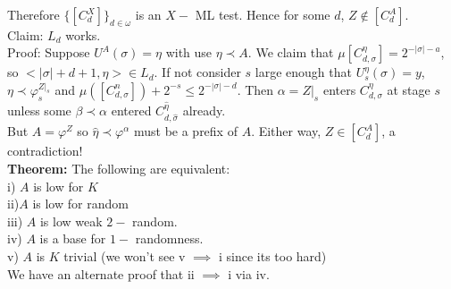 \documentclass{article}
\begin{document}
  Therefore $\{[C^X_d]\}_{d\in \omega}$ is an $X-$ ML test. Hence for some $d$, $Z \not \in [C_d^A]$. \\
  Claim: $L_d$ works.\\
  Proof: Suppose $U^A(\sigma) = \eta$ with use $\eta \prec A$. We claim that $\mu[C^\eta_{d,\sigma}]= 2^{-|\sigma|-a}$, so $<|\sigma|+d+1,\eta> \in L_d$. If not consider $s$ large enough that $U^\eta_s(\sigma) = y$, $\eta \prec \varphi^{Z|_s}_s$ and $\mu([C_{d,\sigma}^n]) + 2^{-s} \leq 2^{-|\sigma|-d}$. Then $\alpha = Z|_s$ enters $C^\eta_{d,\sigma}$ at stage $s$ unless some $\beta \prec \alpha$ entered $C_{d,\hat \sigma}^{\hat \eta}$ already.\\
  But $A = \varphi^Z$ so $\hat \eta \prec \varphi^\alpha$ must be a prefix of $A$. Either way, $Z \in [C_d^A]$, a contradiction!\\
  \textbf{Theorem:} The following are equivalent:\\
  i) $A$ is low for $K$\\
  ii)$A$ is low for random\\
  iii) $A$ is low weak $2-$ random.\\
  iv) $A$ is a base for $1-$ randomness.\\
  v) $A$ is $K$ trivial (we won't see v $\implies$ i since its too hard)\\
  We have an alternate proof that ii $\implies$ i via iv.
  \newpage
\end{document}
